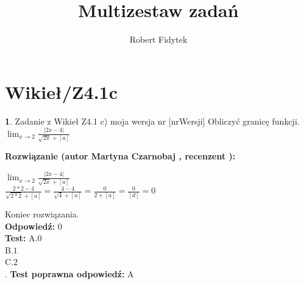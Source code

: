 \documentclass[12pt, a4paper]{article}
\title{Multizestaw zadań}
\author{Robert Fidytek}
\date{}
\theoremstyle{definition} %
\newtheorem{zad}{}
\newcommand{\kategoria}[1]{\section{#1}} %
\newcommand{\zadStart}[1]{\begin{zad}#1\newline} %
\newcommand{\zadStop}{\end{zad}}   %
\newcommand{\rozwStart}[2]{\noindent \textbf{Rozwiązanie (autor #1 , recenzent #2): }\newline} %
\newcommand{\rozwStop}{\newline}                                            %
\newcommand{\odpStart}{\noindent \textbf{Odpowiedź:}\newline}    %
\newcommand{\odpStop}{\newline}                                             %
\newcommand{\testStart}{\noindent \textbf{Test:}\newline} %
\newcommand{\testStop}{\newline} %
\newcommand{\kluczStart}{\noindent \textbf{Test poprawna odpowiedź:}\newline} %
\newcommand{\kluczStop}{\newline} %
\begin{document}
\maketitle


\kategoria{Wikieł/Z4.1c}
\zadStart{Zadanie z Wikieł Z4.1 c) moja wersja nr [nrWersji]}
Obliczyć granicę funkcji.\\
$ \displaystyle \lim_{x \to 2} \frac{|2x - 4|}{\sqrt{2x} + [a]}  $\\
\zadStop
\rozwStart{Martyna Czarnobaj}{}
\begin{center}
	$ \displaystyle \lim_{x \to 2} \frac{|2x - 4|}{\sqrt{2x} + [a]}  $\\
	$ \frac{2 * 2 - 4}{\sqrt{2*2} + [a]} = \frac{4-4}{\sqrt{4} + [a]} = \frac{0}{2+[a]} = \frac{0}{[d]} = 0 $\\
\end{center}

Koniec rozwiązania.\\
\rozwStop
\odpStart
$ 0 $\\
\odpStop
\testStart
A.$ 0 $\\
B.$ 1 $\\
C.$ 2 $\\
.
\testStop
\kluczStart
A
\kluczStop
\end{document}

